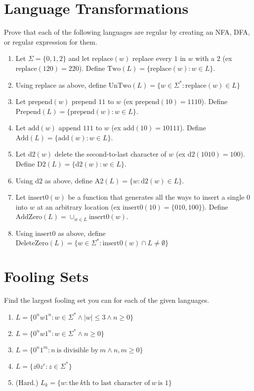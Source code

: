 \documentclass[fleqn]{article}
\begin{document}
\section{Language Transformations}
Prove that each of the following languages are regular by creating an NFA, DFA, or regular expression for them.
\begin{enumerate}
    \item Let $\Sigma = \{0,1,2\}$ and let $\text{replace}(w)$ replace every $1$
    in $w$ with a $2$ (ex $\text{replace}(120) = 220$). Define $\text{Two}(L) = \{\text{replace}(w) : w \in L\}$.
    \item Using $\text{replace}$ as above, define $\text{UnTwo}(L) = \{w \in \Sigma^*: \text{replace}(w) \in L\}$
    \item Let $\text{prepend}(w)$ prepend $11$ to $w$ (ex $\text{prepend}(10) = 1110$). Define $\text{Prepend}(L) = \{\text{prepend}(w) : w \in L\}$.
    \item Let $\text{add}(w)$ append $111$ to $w$ (ex $\text{add}(10) = 10111$). Define $\text{Add}(L) = \{\text{add}(w) : w \in L\}$.
    \item Let $\text{d2}(w)$ delete the second-to-last character of $w$ (ex $\text{d2}(1010) = 100$). Define $\text{D2}(L) = \{\text{d2}(w) : w \in L\}$.
    \item Using $\text{d2}$ as above, define $\text{A2}(L) = \{w : \text{d2}(w) \in L\}$.
    \item Let $\text{insert0}(w)$ be a function that generates all the ways to insert a single $0$ into $w$ at an arbitrary location (ex $\text{insert0}(10) = \{010, 100\}$). Define $\text{AddZero}(L) = \cup_{w \in L}\text{insert0}(w)$.
    \item Using $\text{insert0}$ as above, define $\text{DeleteZero}(L) = \{w \in \Sigma^* : \text{insert0}(w) \cap L \neq \emptyset\}$
\end{enumerate}

\section{Fooling Sets}
Find the largest fooling set you can for each of the given languages.
\begin{enumerate}
    \item $L = \{0^n w 1^n : w \in \Sigma^* \wedge |w| \leq 3 \wedge n \geq 0\}$
    \item $L = \{0^n w 1^n : w \in \Sigma^* \wedge n \geq 0\}$
    \item $L = \{0^n 1^m : n~\text{is divisible by}~m \wedge n,m \geq 0\}$
    \item $L = \{z0z^r : z \in \Sigma^*\}$
    \item (Hard.) $L_k = \{w : \text{the}~ k\text{th to last character of}~w~\text{is } 1\}$
\end{enumerate}
\end{document}
